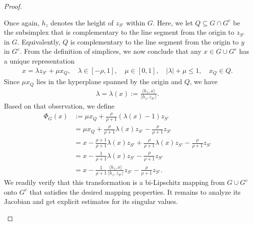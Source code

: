 \documentclass[10pt,a4paper]{article}
\begin{document}
\begin{proof}
\begin{itemize}
        Once again, $h_{z}$ denotes the height of $z_{S'}$ within $G$.
        Here, we let $Q \subseteq G \cap G^{c}$ be the subsimplex 
        that is complementary to the line segment from the origin to $z_{S'}$ in $G$.
        Equivalently, $Q$ is complementary to the line segment from the origin to $y$ in $G^{c}$.
        From the definition of simplices, we now conclude that any $x \in G \cup G^{c}$ 
        has a unique representation
        \begin{align*}
            x = \lambda z_{S'} + \mu x_{Q}, \quad \lambda \in [-\rho,1], \quad \mu \in [0,1], \quad |\lambda| + \mu \leq 1, \quad x_{Q} \in Q.
        \end{align*}
        Since $\mu x_{Q}$ lies in the hyperplane spanned by the origin and $Q$, we have 
        \begin{align*}
            \lambda = \lambda(x) := \frac{\langle h_{z},x\rangle}{\langle h_{z},z_{S'}\rangle} 
            .
        \end{align*}
        Based on that observation, we define 
        \begin{align*}
            \Phi_{G}(x) 
            &
            := 
            \mu x_{Q} + \frac{\rho}{\rho+1} \left( \lambda(x) - 1 \right) z_{S'}
            \\&
            = 
            \mu x_{Q} + \frac{\rho}{\rho+1} \lambda(x) z_{S'} - \frac{\rho}{\rho+1} z_{S'}
            \\&
            = 
            x - \frac{\rho+1}{\rho+1} \lambda(x) z_{S'} + \frac{\rho}{\rho+1} \lambda(x) z_{S'} - \frac{\rho}{\rho+1} z_{S'}
            \\&
            = 
            x - \frac{1}{\rho+1} \lambda(x) z_{S'} - \frac{\rho}{\rho+1} z_{S'}
            \\&
            = 
            x - \frac{1}{\rho+1} \frac{\langle h_{z},x\rangle}{\langle h_{z},z_{S'}\rangle} z_{S'} - \frac{\rho}{\rho+1} z_{S'}
            .
        \end{align*}
        We readily verify that this transformation is a bi-Lipschitz mapping from $G \cup G^{c}$ onto $G^{c}$
        that satisfies the desired mapping properties. 
        It remains to analyze its Jacobian and get explicit estimates for its singular values. 
        

\end{itemize}
\end{proof}
\end{document}
